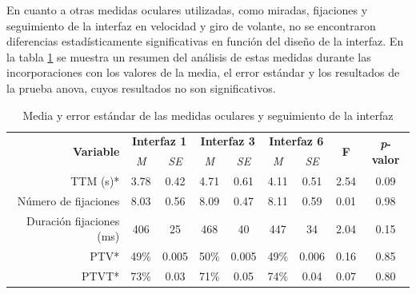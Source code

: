 En cuanto a otras medidas oculares utilizadas, como miradas, fijaciones y seguimiento de la interfaz en velocidad y giro de volante, no se encontraron diferencias estadísticamente significativas en función del diseño de la interfaz. En la tabla \ref{tab:3.8} se muestra un resumen del análisis de estas medidas durante las incorporaciones con los valores de la media, el error estándar y los resultados de la prueba \gls{anova}, cuyos resultados no son significativos.

\newpage
\begin{table}[h]
\centering
\begin{tabular}{rcc|cc|cc|cc}
\multirow{2}{*}{\textbf{Variable}} & \multicolumn{2}{c|}{\textbf{Interfaz 1}} & \multicolumn{2}{c|}{\textbf{Interfaz 3}} & \multicolumn{2}{c|}{\textbf{Interfaz 6}} & \multirow{2}{*}{\textbf{F}} & \multirow{2}{*}{\textbf{\emph{p}-valor}} \\ \cline{2-7}
                                   & \textit{M}         & \textit{SE}         & \textit{M}         & \textit{SE}         & \textit{M}         & \textit{SE}         &                             &                                   \\ \hline
TTM (s)*                           & 3.78               & 0.42                & 4.71               & 0.61                & 4.11               & 0.51                & 2.54                        & 0.09                              \\ \hline
Número de fijaciones               & 8.03               & 0.56                & 8.09               & 0.47                & 8.11               & 0.59                & 0.01                        & 0.98                              \\ \hline
Duración fijaciones (ms)           & 406                & 25                  & 468                & 40                  & 447                & 34                  & 2.04                        & 0.15                              \\ \hline
PTV*                               & 49\%               & 0.005               & 50\%               & 0.005               & 49\%               & 0.006               & 0.16                        & 0.85                              \\ \hline
PTVT*                              & 73\%               & 0.03                & 71\%               & 0.05                & 74\%               & 0.04                & 0.07                        & 0.80                              \\ \hline
\end{tabular}%
\caption{Media y error estándar de las medidas oculares y seguimiento de la interfaz}
\label{tab:3.8}
\end{table}

